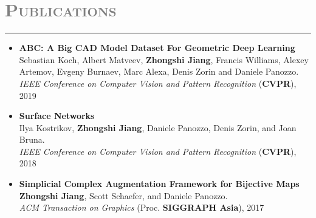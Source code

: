 \documentclass[letterpaper,11pt]{article}
\newcommand{\resheading}[1]{
\vspace{0pt}
\section*{\scshape \textcolor{gray}{#1}}
\rule{\textwidth}{0.5pt}
  \vspace{-15pt}
}
\begin{document}
\resheading{Publications}
\vspace{-2pt}
\begin{itemize}[label=,leftmargin=*]

\item \textbf{ABC: A Big CAD Model Dataset For Geometric Deep Learning}\\
Sebastian Koch, Albert Matveev, \textbf{Zhongshi Jiang}, Francis Williams, Alexey Artemov, Evgeny Burnaev, Marc Alexa, Denis Zorin and Daniele Panozzo.
\\ \textit{IEEE Conference on Computer Vision and Pattern Recognition} (\textbf{CVPR}), 2019

\item \textbf{Surface Networks}\\
Ilya Kostrikov, \textbf{Zhongshi Jiang}, Daniele Panozzo, Denis Zorin, and Joan Bruna.
\\ \textit{IEEE Conference on Computer Vision and Pattern Recognition} (\textbf{CVPR}), 2018

\item \textbf{Simplicial Complex Augmentation Framework for Bijective Maps}\\
\textbf{Zhongshi Jiang}, Scott Schaefer, and Daniele Panozzo.
\\ \textit{ACM Transaction on Graphics} (Proc. \textbf{SIGGRAPH Asia}), 2017
\end{itemize}
\end{document}
